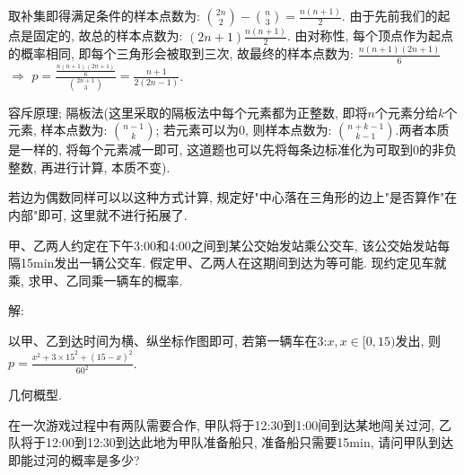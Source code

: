 \documentclass[standard]{ExBook}
\begin{document}
\begin{qitems}
\begin{bbox}
取补集即得满足条件的样本点数为: $\binom{2n}{2}-\binom{n}{3}=\frac{n(n+1)}{2}$. 由于先前我们的起点是固定的, 故总的样本点数为: $(2n+1)\frac{n(n+1)}{2}$. 由对称性, 每个顶点作为起点的概率相同, 即每个三角形会被取到三次, 故最终的样本点数为: $\frac{n(n+1)(2n+1)}{6}$ $\Longrightarrow$ $p=\frac{\frac{n(n+1)(2n+1)}{6}}{\binom{2n+1}{3}}=\frac{n+1}{2(2n-1)}$.
    \end{bbox}

\vspace{-5em}

    \begin{bbox}
\textcolor{themeColor}{\selectfont {} 容斥原理; 隔板法(这里采取的隔板法中每个元素都为正整数, 即将$n$个元素分给$k$个元素, 样本点数为: $\binom{n-1}{k}$; 若元素可以为0, 则样本点数为: $\binom{n+k-1}{k-1}$.两者本质是一样的, 将每个元素减一即可, 这道题也可以先将每条边标准化为可取到0的非负整数, 再进行计算, 本质不变).}

\textcolor{themeColor}{\selectfont {} 若边为偶数同样可以以这种方式计算, 规定好"中心落在三角形的边上"是否算作"在内部"即可, 这里就不进行拓展了.}
    \end{bbox}

\vspace{-5em}

    \begin{bbox}
    \begin{shaded}
        \qitem
甲、乙两人约定在下午3:00和4:00之间到某公交始发站乘公交车, 该公交始发站每隔15min发出一辆公交车. 假定甲、乙两人在这期间到达为等可能. 现约定见车就乘, 求甲、乙同乘一辆车的概率.
    \end{shaded}
    \end{bbox}

\vspace{-5em}

    \begin{bbox}
解: 

以甲、乙到达时间为横、纵坐标作图即可, 若第一辆车在3:$x,x\in[0,15)$发出, 则$p=\frac{x^2+3\times15^2+(15-x)^2}{60^2}$.

\textcolor{themeColor}{\selectfont {} 几何概型.}
    \end{bbox}

\vspace{-5em}

    \begin{bbox}
    \begin{shaded}
        \qitem
在一次游戏过程中有两队需要合作, 甲队将于12:30到1:00间到达某地闯关过河, 乙队将于12:00到12:30到达此地为甲队准备船只, 准备船只需要15min, 请问甲队到达即能过河的概率是多少?
    \end{shaded}
    \end{bbox}


\end{qitems}
\end{document}
